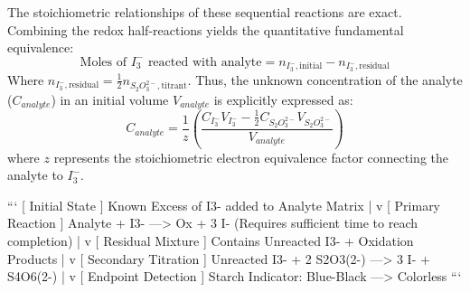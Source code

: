 \documentclass[12pt]{article}
\begin{document}
The stoichiometric relationships of these sequential reactions are exact. Combining the redox half-reactions yields the quantitative fundamental equivalence:
\begin{equation}
\text{Moles of } I_3^- \text{ reacted with analyte} = n_{I_3^-, \text{initial}} - n_{I_3^-, \text{residual}}
\end{equation}
Where $n_{I_3^-, \text{residual}} = \frac{1}{2} n_{S_2O_3^{2-}, \text{titrant}}$. Thus, the unknown concentration of the analyte ($C_{analyte}$) in an initial volume $V_{analyte}$ is explicitly expressed as:
\begin{equation}
C_{analyte} = \frac{1}{z} \left( \frac{C_{I_3^-} V_{I_3^-} - \frac{1}{2} C_{S_2O_3^{2-}} V_{S_2O_3^{2-}}}{V_{analyte}} \right)
\end{equation}
where $z$ represents the stoichiometric electron equivalence factor connecting the analyte to $I_3^-$.

```
                       [ Initial State ]
           Known Excess of I3- added to Analyte Matrix
                               |
                               v
                       [ Primary Reaction ]
                Analyte + I3- ---> Ox + 3 I-
         (Requires sufficient time to reach completion)
                               |
                               v
                      [ Residual Mixture ]
             Contains Unreacted I3- + Oxidation Products
                               |
                               v
                     [ Secondary Titration ]
            Unreacted I3- + 2 S2O3(2-) ---> 3 I- + S4O6(2-)
                               |
                               v
                     [ Endpoint Detection ]
            Starch Indicator: Blue-Black ---> Colorless
```
\end{document}
